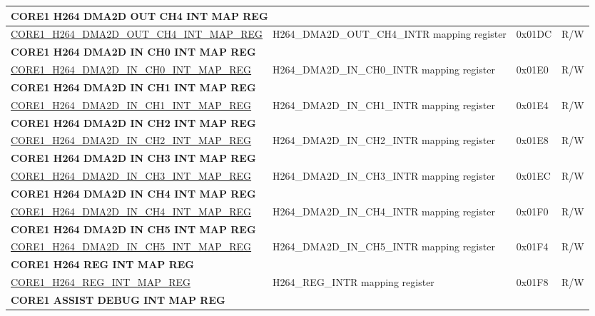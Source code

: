 \begin{longtable}{ | p{7.5cm} | p{7.2cm} | p{1.3cm} | p{1cm} | }
\multicolumn{4}{|l|}{\textbf{CORE1 H264 DMA2D OUT CH4 INT MAP REG}} \\ \hline
\hyperref[regdesc:CORE1H264DMA2DOUTCH4INTMAPREG]{CORE1\_H264\_DMA2D\_OUT\_CH4\_INT\_MAP\_REG} & H264\_DMA2D\_OUT\_CH4\_INTR mapping register & 0x01DC & R/W \\ \hline
\multicolumn{4}{|l|}{\textbf{CORE1 H264 DMA2D IN CH0 INT MAP REG}} \\ \hline
\hyperref[regdesc:CORE1H264DMA2DINCH0INTMAPREG]{CORE1\_H264\_DMA2D\_IN\_CH0\_INT\_MAP\_REG} & H264\_DMA2D\_IN\_CH0\_INTR mapping register & 0x01E0 & R/W \\ \hline
\multicolumn{4}{|l|}{\textbf{CORE1 H264 DMA2D IN CH1 INT MAP REG}} \\ \hline
\hyperref[regdesc:CORE1H264DMA2DINCH1INTMAPREG]{CORE1\_H264\_DMA2D\_IN\_CH1\_INT\_MAP\_REG} & H264\_DMA2D\_IN\_CH1\_INTR mapping register & 0x01E4 & R/W \\ \hline
\multicolumn{4}{|l|}{\textbf{CORE1 H264 DMA2D IN CH2 INT MAP REG}} \\ \hline
\hyperref[regdesc:CORE1H264DMA2DINCH2INTMAPREG]{CORE1\_H264\_DMA2D\_IN\_CH2\_INT\_MAP\_REG} & H264\_DMA2D\_IN\_CH2\_INTR mapping register & 0x01E8 & R/W \\ \hline
\multicolumn{4}{|l|}{\textbf{CORE1 H264 DMA2D IN CH3 INT MAP REG}} \\ \hline
\hyperref[regdesc:CORE1H264DMA2DINCH3INTMAPREG]{CORE1\_H264\_DMA2D\_IN\_CH3\_INT\_MAP\_REG} & H264\_DMA2D\_IN\_CH3\_INTR mapping register & 0x01EC & R/W \\ \hline
\multicolumn{4}{|l|}{\textbf{CORE1 H264 DMA2D IN CH4 INT MAP REG}} \\ \hline
\hyperref[regdesc:CORE1H264DMA2DINCH4INTMAPREG]{CORE1\_H264\_DMA2D\_IN\_CH4\_INT\_MAP\_REG} & H264\_DMA2D\_IN\_CH4\_INTR mapping register & 0x01F0 & R/W \\ \hline
\multicolumn{4}{|l|}{\textbf{CORE1 H264 DMA2D IN CH5 INT MAP REG}} \\ \hline
\hyperref[regdesc:CORE1H264DMA2DINCH5INTMAPREG]{CORE1\_H264\_DMA2D\_IN\_CH5\_INT\_MAP\_REG} & H264\_DMA2D\_IN\_CH5\_INTR mapping register & 0x01F4 & R/W \\ \hline
\multicolumn{4}{|l|}{\textbf{CORE1 H264 REG INT MAP REG}} \\ \hline
\hyperref[regdesc:CORE1H264REGINTMAPREG]{CORE1\_H264\_REG\_INT\_MAP\_REG} & H264\_REG\_INTR mapping register & 0x01F8 & R/W \\ \hline
\multicolumn{4}{|l|}{\textbf{CORE1 ASSIST DEBUG INT MAP REG}} \\ \hline

\end{longtable}
